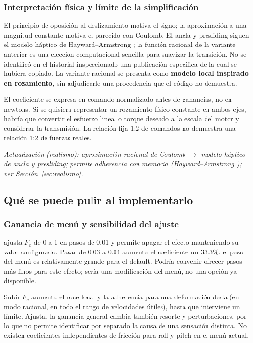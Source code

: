 \subsubsection{Interpretación física y límite de la simplificación}
El principio de oposición al deslizamiento motiva el signo; la aproximación a una magnitud constante motiva el parecido con Coulomb. El ancla y presliding siguen el modelo háptico de Hayward--Armstrong \cite{hayward2000}; la función racional de la variante anterior es una elección computacional sencilla para suavizar la transición. No se identificó en el historial inspeccionado una publicación específica de la cual se hubiera copiado. La variante racional se presenta como \textbf{modelo local inspirado en rozamiento}, sin adjudicarle una procedencia que el código no demuestra.

El coeficiente se expresa en comando normalizado antes de ganancias, no en newtons. Si se quisiera representar un rozamiento físico constante en ambos ejes, habría que convertir el esfuerzo lineal o torque deseado a la escala del motor y considerar la transmisión. La relación fija 1:2 de comandos no demuestra una relación 1:2 de fuerzas reales.

\textit{Actualización (realismo): aproximación racional de Coulomb $\rightarrow$ modelo háptico de ancla y presliding; permite adherencia con memoria (Hayward--Armstrong \cite{hayward2000}); ver Sección~\ref{sec:realismo}.}

\subsection{Qué se puede pulir al implementarlo}
\subsubsection{Ganancia de menú y sensibilidad del ajuste}
 ajusta $F_c$ de 0 a 1 en pasos de 0.01 y permite apagar el efecto manteniendo su valor configurado. Pasar de 0.03 a 0.04 aumenta el coeficiente un $33.3\%$: el paso del menú es relativamente grande para el default. Podría convenir ofrecer pasos más finos para este efecto; sería una modificación del menú, no una opción ya disponible.

Subir $F_c$ aumenta el roce local y la adherencia para una deformación dada (en modo racional, en todo el rango de velocidades útiles), hasta que interviene un límite. Ajustar la ganancia general cambia también resorte y perturbaciones, por lo que no permite identificar por separado la causa de una sensación distinta. No existen coeficientes independientes de fricción para roll y pitch en el menú actual.

